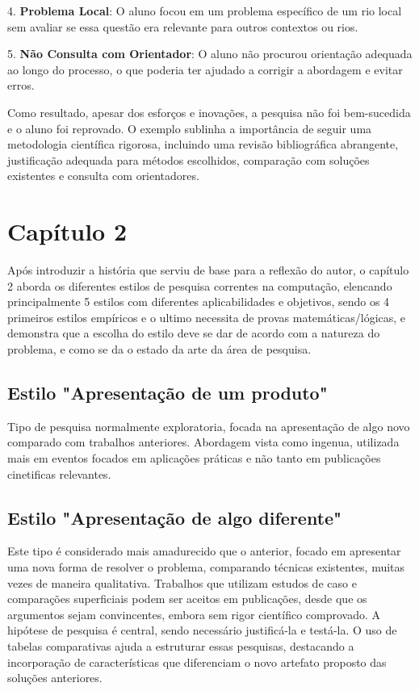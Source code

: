 \documentclass[
	12pt,				%
	openright,			%
	oneside,			%
	a4paper,			%
	chapter=TITLE,		%
	subsection=TITLE,	%
	english,			%
	brazilian,				%
	]{abntex2}
\begin{document}
4. \textbf{Problema Local}: O aluno focou em um problema específico de um rio local sem avaliar se essa questão era relevante para outros contextos ou rios.

5. \textbf{Não Consulta com Orientador}: O aluno não procurou orientação adequada ao longo do processo, o que poderia ter ajudado a corrigir a abordagem e evitar erros.

Como resultado, apesar dos esforços e inovações, a pesquisa não foi bem-sucedida e o aluno foi reprovado. O exemplo sublinha a importância de seguir uma metodologia científica rigorosa, incluindo uma revisão bibliográfica abrangente, justificação adequada para métodos escolhidos, comparação com soluções existentes e consulta com orientadores.

\section*{Capítulo 2}
Após introduzir a história que serviu de base para a reflexão do autor, o capítulo 2 aborda os diferentes estilos de pesquisa correntes na computação, elencando principalmente 5 estilos com diferentes aplicabilidades e objetivos, sendo os 4 primeiros estilos empíricos e o ultimo necessita de provas matemáticas/lógicas, e demonstra que a escolha do estilo deve se dar de acordo com a natureza do problema, e como se da o estado da arte da área de pesquisa.

\subsection*{Estilo "Apresentação de um produto"}
Tipo de pesquisa normalmente exploratoria, focada na apresentação de algo novo comparado com trabalhos anteriores. Abordagem vista como ingenua, utilizada mais em eventos focados em aplicações práticas e não tanto em publicações cinetificas relevantes.

\subsection*{Estilo "Apresentação de algo diferente"}
Este tipo é considerado mais amadurecido que o anterior, focado em apresentar uma nova forma de resolver o problema, comparando técnicas existentes, muitas vezes de maneira qualitativa. Trabalhos que utilizam estudos de caso e comparações superficiais podem ser aceitos em publicações, desde que os argumentos sejam convincentes, embora sem rigor científico comprovado. A hipótese de pesquisa é central, sendo necessário justificá-la e testá-la. O uso de tabelas comparativas ajuda a estruturar essas pesquisas, destacando a incorporação de características que diferenciam o novo artefato proposto das soluções anteriores.
\end{document}
